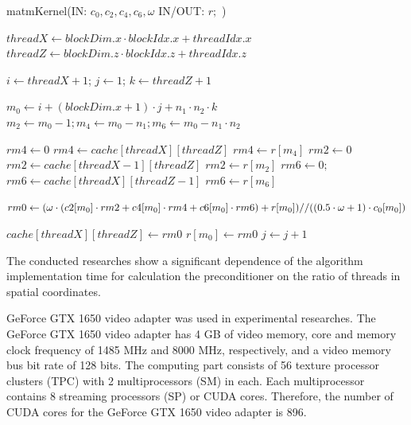\documentclass{svproc}
\begin{document}
\begin{algorithm}[h!]
	\caption{matmKernel(IN: $c_0, c_2, c_4, c_6, \omega$ IN/OUT: $r;$ )}\label{alg:ptmKernel3}
	\begin{algorithmic}[1]
		
		\State $threadX \gets blockDim.x \cdot blockIdx.x + threadIdx.x$		
		\State $threadZ \gets blockDim.z \cdot blockIdx.z + threadIdx.z$		
		
		\State $i \gets threadX  + 1$; $j \gets 1$; $k \gets threadZ  + 1$	
		
		
		\State $m_0 \gets i + (blockDim.x + 1) \cdot j + n_1 \cdot n_2 \cdot k$						
		\State $m_2 \gets m_0 - 1; m_4 \gets m_0 - n_1; m_6 \gets m_0 - n_1 \cdot n_2$
		
		\State $rm4 \gets 0$
		\State $rm4 \gets cache[threadX][threadZ]$
		\Else 			     
		\State $rm4 \gets r[m_4]$
		\EndIf
		\State $rm2 \gets 0$    
		\State $rm2 \gets cache[threadX - 1][threadZ]$
		\Else
		\State $rm2 \gets r[m_2]$
		\EndIf	
		\State $rm6 \gets 0;$
		\State $rm6 \gets cache[threadX][threadZ - 1]$
		\Else
		\State $rm6 \gets r[m_6]$
		\EndIf
		
		\State \parbox[t]{\dimexpr\linewidth-\algorithmicindent-\algorithmicindent-\algorithmicindent-\algorithmicindent-\algorithmicindent}{$ rm0 \gets (\omega \cdot (c2[m_0] \cdot rm2 + c4[m_0] \cdot rm4 + c6[m_0] \cdot rm6) + r[m_0]) / \\
			/ ((0.5 \cdot \omega + 1) \cdot c_0[m_0]) $}
		
		\State $cache[threadX][threadZ] \gets rm0$
		\State $r[m_0] \gets rm0$			     		   
		\EndIf
		\State $j \gets j + 1 $   
		\EndIf	     		     
		\EndFor
		
	\end{algorithmic}
\end{algorithm}

The conducted researches show a significant dependence of the algorithm implementation time for calculation the preconditioner on the ratio of threads in spatial coordinates.

GeForce GTX 1650 video adapter was used in experimental researches. The GeForce GTX 1650 video adapter has 4 GB of video memory, core and memory clock frequency of 1485 MHz and 8000 MHz, respectively, and a video memory bus bit rate of 128 bits.
The computing part consists of 56 texture processor clusters (TPC) with 2 multiprocessors (SM) in each. Each multiprocessor contains 8 streaming processors (SP) or CUDA cores.
Therefore, the number of CUDA cores for the GeForce GTX 1650 video adapter is 896.
\end{document}
